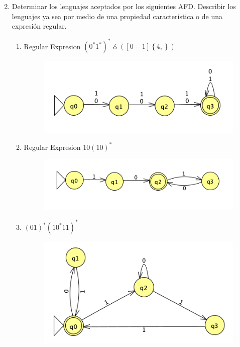 \documentclass[
	12pt, %
]{fphw}
\begin{document}
\newpage
\begin{enumerate}
  \setcounter{enumi}{1}
\item Determinar los lenguajes aceptados por los siguientes AFD. Describir los lenguajes ya sea por medio de una propiedad característica o de una expresión regular.
  \begin{enumerate}[i]
  \item Regular Expresion $\left(0^{*}1^{*}\right)^{*}$ ó $([0-1]\left\lbrace 4, \right\rbrace)$\\
    \begin{figure}[H]
      \centering
      \includegraphics[width=\linewidth]{images/graph1.png}
    \end{figure}
  \item Regular Expresion $10\left(10\right)^{*}$\\
    \begin{figure}[H]
      \centering
      \includegraphics[width=\linewidth]{images/graph2.png}
    \end{figure}
    \newpage
  \item $(01)^{*}(10^{*}11)^{*}$\\
    \begin{figure}[H]
      \centering
      \includegraphics[width=\linewidth]{images/graph3.png}

\end{figure}
\end{enumerate}
\end{enumerate}
\end{document}
